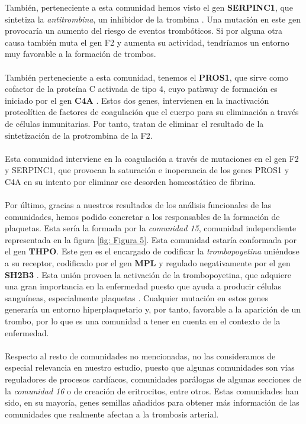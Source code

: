  También, perteneciente a esta comunidad hemos visto el gen \textbf{SERPINC1}, que sintetiza la \textit{antitrombina}, un inhibidor de la trombina \cite{SERPINC1}. Una mutación en este gen provocaría un aumento del riesgo de eventos trombóticos. Si por alguna otra causa también muta el gen F2 y aumenta su actividad, tendríamos un entorno muy favorable a la formación de trombos.\\\\
También perteneciente a esta comunidad, tenemos el \textbf{PROS1}, que sirve como cofactor de la proteína C activada de tipo 4, cuyo pathway de formación es iniciado por el gen \textbf{C4A} \cite{PROS1}. Estos dos genes, intervienen en la inactivación proteolítica de factores de coagulación que el cuerpo para su eliminación a través de células inmunitarias. Por tanto, tratan de eliminar el resultado de la sintetización de la protrombina de la F2.\\\\ Esta comunidad interviene en la coagulación a través de mutaciones en el gen F2 y SERPINC1, que provocan la saturación e inoperancia de los genes PROS1 y C4A en su intento por eliminar ese desorden homeostático de fibrina.\\\\
Por último, gracias a nuestros resultados de los análisis funcionales de las comunidades, hemos podido concretar a los responsables de la formación de plaquetas. Esta sería la formada por la \textit{comunidad 15}, comunidad independiente representada en la figura \ref{fig: Figura 5}. Esta comunidad estaría conformada por el gen \textbf{THPO}. Este gen es el encargado de codificar la \textit{trombopoyetina} uniéndose a su receptor\cite{THPO_MPL}, codificado por el gen \textbf{MPL} \cite{THPO_MPL} y regulado negativamente por el gen \textbf{SH2B3} \cite{SH2B3}. Esta unión provoca la activación de la trombopoyetina, que adquiere una gran importancia en la enfermedad puesto que ayuda a producir células sanguíneas, especialmente plaquetas \cite{THPO_MPL}. Cualquier mutación en estos genes generaría un entorno hiperplaquetario y, por tanto, favorable a la aparición de un trombo, por lo que es una comunidad a tener en cuenta en el contexto de la enfermedad.\\\\
Respecto al resto de comunidades no mencionadas, no las consideramos de especial relevancia en nuestro estudio, puesto que algunas comunidades son vías reguladores de procesos cardíacos, comunidades parálogas de algunas secciones de la \textit{comunidad 16} o de creación de eritrocitos, entre otros. Estas comunidades han sido, en su mayoría, genes semillas añadidos para obtener más información de las comunidades que realmente afectan a la trombosis arterial.


